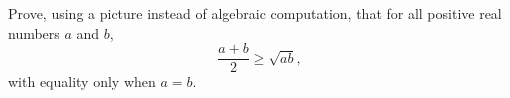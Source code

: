 Prove, using a picture instead of algebraic computation, that for all positive real numbers $a$ and $b$,
\[
\dfrac{a+b}{2}\ge\sqrt{ab},
\]
with equality only when $a=b$.
